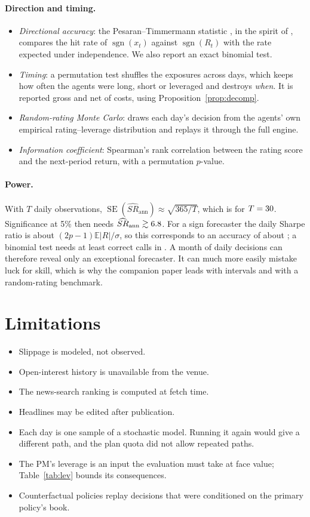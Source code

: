 \documentclass[11pt]{article}
\theoremstyle{remark}
\newcommand{\E}{\mathbb{E}}
\newcommand{\sgn}{\operatorname{sgn}}
\begin{document}
\paragraph{Direction and timing.}
\begin{itemize}
\item \emph{Directional accuracy}: the Pesaran--Timmermann statistic \citep{pesaran1992simple}, in the spirit of \citet{henriksson1981market}, compares the hit rate of $\sgn(x_t)$ against $\sgn(R_t)$ with the rate expected under independence. We also report an exact binomial test.
\item \emph{Timing}: a permutation test shuffles the exposures across days, which keeps how often the agents were long, short or leveraged and destroys \emph{when}. It is reported gross and net of costs, using Proposition~\ref{prop:decomp}.
\item \emph{Random-rating Monte Carlo}: draws each day's decision from the agents' own empirical rating--leverage distribution and replays it through the full engine.
\item \emph{Information coefficient}: Spearman's rank correlation between the rating score and the next-period return, with a permutation $p$-value.
\end{itemize}

\paragraph{Power.} With $T$ daily observations, $\operatorname{SE}(\widehat{SR}_{\text{ann}})\approx\sqrt{365/T}$, which is \PowSE{} for $T=30$. Significance at 5\% then needs $\widehat{SR}_{\text{ann}}\gtrsim6.8$. For a sign forecaster the daily Sharpe ratio is about $(2p-1)\E|R|/\sigma$, so this corresponds to an accuracy of about \PowP{}; a binomial test needs at least \PowHits{} correct calls in \PowT{}. A month of daily decisions can therefore reveal only an exceptional forecaster. It can much more easily mistake luck for skill, which is why the companion paper leads with intervals and with a random-rating benchmark.

\section{Limitations}
\begin{itemize}
\item Slippage is modeled, not observed.
\item Open-interest history is unavailable from the venue.
\item The news-search ranking is computed at fetch time.
\item Headlines may be edited after publication.
\item Each day is one sample of a stochastic model. Running it again would give a different path, and the plan quota did not allow repeated paths.
\item The PM's leverage is an input the evaluation must take at face value; Table~\ref{tab:lev} bounds its consequences.
\item Counterfactual policies replay decisions that were conditioned on the primary policy's book.
\end{itemize}
\end{document}
